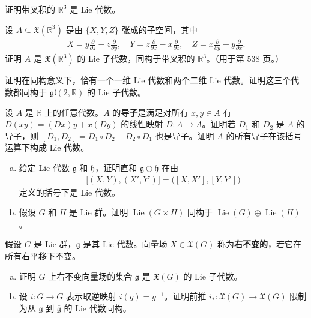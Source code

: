 \documentclass[../../main.tex]{subfiles}
\begin{document}
\begin{exercise}\label{exercise:ch08-19}
证明带叉积的 $\mathbb{R}^3$ 是 Lie 代数。
\end{exercise}

\begin{exercise}\label{exercise:ch08-20}
设 $A\subseteq\mathfrak{X}(\mathbb{R}^3)$ 是由 $\{X,Y,Z\}$ 张成的子空间，其中
\begin{align*}
X=y\frac{\partial}{\partial z}-z\frac{\partial}{\partial y},\quad
Y=z\frac{\partial}{\partial x}-x\frac{\partial}{\partial z},\quad
Z=x\frac{\partial}{\partial y}-y\frac{\partial}{\partial x}.
\end{align*}
证明 $A$ 是 $\mathfrak{X}(\mathbb{R}^3)$ 的 Lie 子代数，同构于带叉积的 $\mathbb{R}^3$。（用于第 538 页。）
\end{exercise}

\begin{exercise}\label{exercise:ch08-21}
证明在同构意义下，恰有一个一维 Lie 代数和两个二维 Lie 代数。证明这三个代数都同构于 $\mathfrak{gl}(2,\mathbb{R})$ 的 Lie 子代数。
\end{exercise}

\begin{exercise}\label{exercise:ch08-22}
设 $A$ 是 $\mathbb{R}$ 上的任意代数。$A$ 的\textbf{导子}是满足对所有 $x,y\in A$ 有 $D(xy)=(Dx)y+x(Dy)$ 的线性映射 $D\colon A\to A$。证明若 $D_1$ 和 $D_2$ 是 $A$ 的导子，则 $[D_1,D_2]=D_1\circ D_2-D_2\circ D_1$ 也是导子。证明 $A$ 的所有导子在该括号运算下构成 Lie 代数。
\end{exercise}

\begin{exercise}\label{exercise:ch08-23}
\begin{enumerate}[(a)]
\item 给定 Lie 代数 $\mathfrak{g}$ 和 $\mathfrak{h}$，证明直和 $\mathfrak{g}\oplus\mathfrak{h}$ 在由
\begin{align*}
\bigl[(X,Y),(X',Y')\bigr]=\bigl([X,X'],[Y,Y']\bigr)
\end{align*}
定义的括号下是 Lie 代数。

\item 假设 $G$ 和 $H$ 是 Lie 群。证明 $\operatorname{Lie}(G\times H)$ 同构于 $\operatorname{Lie}(G)\oplus\operatorname{Lie}(H)$。
\end{enumerate}
\end{exercise}

\begin{exercise}\label{exercise:ch08-24}
假设 $G$ 是 Lie 群，$\mathfrak{g}$ 是其 Lie 代数。向量场 $X\in\mathfrak{X}(G)$ 称为\textbf{右不变的}，若它在所有右平移下不变。
\begin{enumerate}[(a)]
\item 证明 $G$ 上右不变向量场的集合 $\overline{\mathfrak{g}}$ 是 $\mathfrak{X}(G)$ 的 Lie 子代数。

\item 设 $i\colon G\to G$ 表示取逆映射 $i(g)=g^{-1}$。证明前推 $i_*\colon\mathfrak{X}(G)\to\mathfrak{X}(G)$ 限制为从 $\mathfrak{g}$ 到 $\overline{\mathfrak{g}}$ 的 Lie 代数同构。
\end{enumerate}
\end{exercise}
\end{document}
